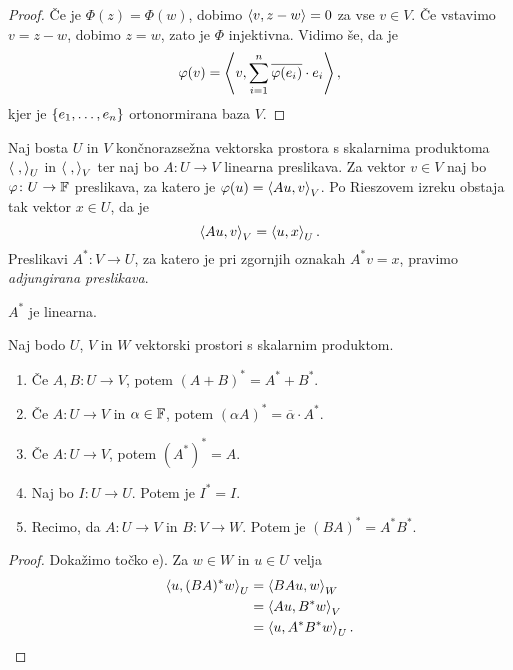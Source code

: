 \documentclass[12pt, a4paper]{article}
\begin{document}
\begin{proof}
Če je $\Phi(z)=\Phi(w)$, dobimo $\left\langle v,z-w\right\rangle=0$ za vse $v\in V$. Če vstavimo $v=z-w$, dobimo $z=w$, zato je $\Phi$ injektivna. Vidimo še, da je
\[
\varphi(v)=\left\langle v,\sum_{i=1}^n\overline{\varphi(e_i)}\cdot e_i\right\rangle,
\]
kjer je $\left\{e_1,\dots,e_n\right\}$ ortonormirana baza $V$.
\end{proof}

\begin{definicija}
Naj bosta $U$ in $V$ končnorazsežna vektorska prostora s skalarnima produktoma $\left\langle \;,\right\rangle_U$ in $\left\langle \;,\right\rangle_V$ ter naj bo $A\colon U\to V$ linearna preslikava. Za vektor $v\in V$ naj bo $\varphi\colon U\to\mathbb{F}$ preslikava, za katero je $\varphi(u)=\left\langle Au,v\right\rangle_V$. Po Rieszovem izreku obstaja tak vektor $x\in U$, da je
\[
\left\langle Au,v\right\rangle_V=\left\langle u,x\right\rangle_U.
\]
Preslikavi $A^*\colon V\to U$, za katero je pri zgornjih oznakah $A^*v=x$, pravimo \emph{adjungirana preslikava}.
\end{definicija}

\begin{trditev}
$A^*$ je linearna.
\end{trditev}

\obvs

\begin{trditev}
Naj bodo $U$, $V$ in $W$ vektorski prostori s skalarnim produktom.

\begin{enumerate}[label=\alph*)]
\item Če $A,B\colon U\to V$, potem $(A+B)^*=A^*+B^*$.
\item Če $A\colon U\to V$ in $\alpha\in\mathbb{F}$, potem $(\alpha A)^*=\overline{\alpha}\cdot A^*$.
\item Če $A\colon U\to V$, potem $(A^*)^*=A$.
\item Naj bo $I\colon U\to U$. Potem je $I^*=I$.
\item Recimo, da $A\colon U\to V$ in $B\colon V\to W$. Potem je $(BA)^*=A^*B^*$.
\end{enumerate}
\end{trditev}

\begin{proof}
Dokažimo točko e). Za $w\in W$ in $u\in U$ velja
\begin{align*}
\left\langle u,(BA)^*w\right\rangle_U&=\left\langle BAu,w\right\rangle_W
\\
&=\left\langle Au,B^*w\right\rangle_V
\\
&=\left\langle u,A^*B^*w\right\rangle_U.\qedhere
\end{align*}
\end{proof}
\end{document}
